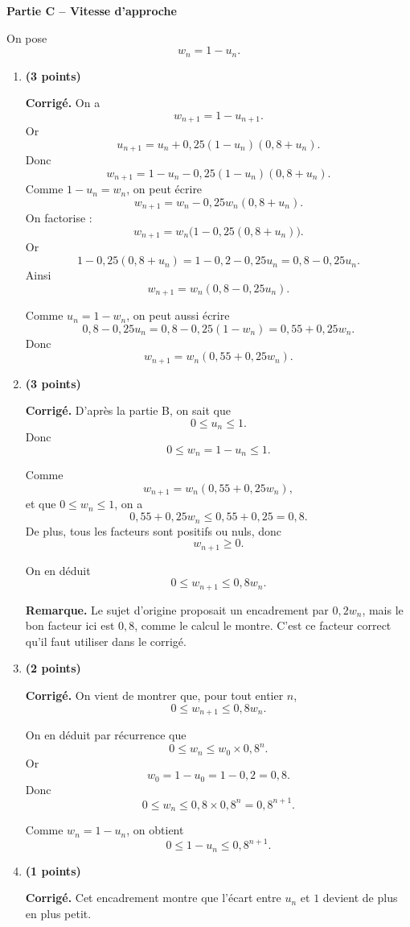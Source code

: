 \documentclass[11pt,a4paper]{article}
\newcommand{\bareme}[1]{\hfill{\color{blue!70!black}\textbf{(#1 points)}}}
\newcommand{\corr}{\noindent\textcolor{blue!70!black}{\textbf{Corrigé. }}}
\newcommand{\rem}{\noindent\textcolor{red!70!black}{\textbf{Remarque. }}}
\begin{document}
\medskip

\textbf{Partie C -- Vitesse d’approche}

On pose
\[
w_n=1-u_n.
\]

\begin{enumerate}[label=\textbf{C.\arabic*.}, leftmargin=0.9cm]

\item \bareme{3}

\corr On a
\[
w_{n+1}=1-u_{n+1}.
\]
Or
\[
u_{n+1}=u_n+0{,}25(1-u_n)(0{,}8+u_n).
\]
Donc
\[
w_{n+1}=1-u_n-0{,}25(1-u_n)(0{,}8+u_n).
\]
Comme $1-u_n=w_n$, on peut écrire
\[
w_{n+1}=w_n-0{,}25w_n(0{,}8+u_n).
\]
On factorise :
\[
w_{n+1}=w_n\bigl(1-0{,}25(0{,}8+u_n)\bigr).
\]
Or
\[
1-0{,}25(0{,}8+u_n)=1-0{,}2-0{,}25u_n=0{,}8-0{,}25u_n.
\]
Ainsi
\[
\boxed{w_{n+1}=w_n(0{,}8-0{,}25u_n).}
\]

Comme $u_n=1-w_n$, on peut aussi écrire
\[
0{,}8-0{,}25u_n=0{,}8-0{,}25(1-w_n)=0{,}55+0{,}25w_n.
\]
Donc
\[
\boxed{w_{n+1}=w_n(0{,}55+0{,}25w_n).}
\]

\item \bareme{3}

\corr D’après la partie B, on sait que
\[
0\leq u_n\leq 1.
\]
Donc
\[
0\leq w_n=1-u_n\leq 1.
\]

Comme
\[
w_{n+1}=w_n(0{,}55+0{,}25w_n),
\]
et que $0\leq w_n\leq 1$, on a
\[
0{,}55+0{,}25w_n\leq 0{,}55+0{,}25=0{,}8.
\]
De plus, tous les facteurs sont positifs ou nuls, donc
\[
w_{n+1}\geq 0.
\]

On en déduit
\[
\boxed{0\leq w_{n+1}\leq 0{,}8w_n.}
\]

\rem Le sujet d’origine proposait un encadrement par $0{,}2w_n$, mais le bon facteur ici est $0{,}8$, comme le calcul le montre. C’est ce facteur correct qu’il faut utiliser dans le corrigé.

\item \bareme{2}

\corr On vient de montrer que, pour tout entier $n$,
\[
0\leq w_{n+1}\leq 0{,}8w_n.
\]

On en déduit par récurrence que
\[
0\leq w_n\leq w_0\times 0{,}8^n.
\]
Or
\[
w_0=1-u_0=1-0{,}2=0{,}8.
\]
Donc
\[
0\leq w_n\leq 0{,}8\times 0{,}8^n=0{,}8^{n+1}.
\]

Comme $w_n=1-u_n$, on obtient
\[
\boxed{0\leq 1-u_n\leq 0{,}8^{n+1}.}
\]

\item \bareme{1}

\corr Cet encadrement montre que l’écart entre $u_n$ et $1$ devient de plus en plus petit.


\end{enumerate}
\end{document}

